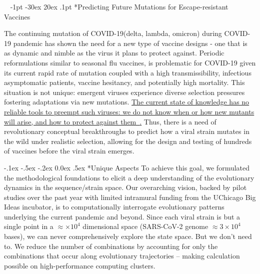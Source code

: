 \documentclass[onecolumn, compsoc,12pt]{IEEEtran}
\makeatletter
\renewcommand\section{\@startsection {section}{1}{\z@}%
                                   {-1pt \@plus -30ex \@minus 20ex}%
                                   {.1pt}%
                                   {\large\bfseries\scshape}}
\renewcommand\paragraph{\@startsection {section}{1}{\z@}%
                                   {-.1ex \@plus -.5ex \@minus -.2ex}%
                                   {0.0ex \@plus.5ex}%
                                   {\fontsize{11}{10}\selectfont\bfseries\itshape\sffamily\color{black}}}
\def\hcov{SARS-CoV-2\xspace}
\def\cov{COVID-19\xspace}
\makeatother
\begin{document}
 

\vspace{20pt}



\clearpage
\setcounter{page}{1}


$\phantom{x}$
\vspace{-35pt}  
\section*{Predicting Future Mutations for  Escape-resistant Vaccines}


The continuing mutation of \cov (delta, lambda, omicron) during \cov pandemic  has shown the need for a new type of vaccine designs - one that is as dynamic and nimble as the virus it plans to protect against. Periodic reformulations similar to  seasonal  flu vaccines,  is  problematic for \cov given its current rapid rate of mutation coupled with a high transmissibility, infectious asymptomatic patients, vaccine hesitancy, and potentially high mortality. This situation is not unique: emergent viruses experience diverse  selection pressures fostering  adaptations via new mutations. \uline{The current state of knowledge has no reliable tools to preempt such viruses: we do not know when or how new mutants will arise, and how to protect against them~\cite{gou2020systematic,hannenhalli1995transforming,jean2007genome,ozery2003two,tesler2002efficient,shao2012approximating,fair2019viral}.} 
Thus, there is a need of revolutionary conceptual  breakthroughs to predict how a viral strain  mutates in the wild under realistic selection, allowing for the design and testing of hundreds of vaccines before the viral strain emerges.

\paragraph*{Unique Aspects} To achieve this goal, we formulated the methodological foundations to elicit a deep understanding of the evolutionary dynamics  in  the sequence/strain space. Our overarching vision, backed by pilot studies over the past year with limited intramural  funding from the UChicago Big Ideas  incubator, is to  computationally interrogate  evolutionary patterns underlying  the current  pandemic and beyond. Since each viral strain is but a single point in a  $\approx  \times10^4$ dimensional space (\hcov genome  $\approx 3 \times 10^4$ bases), we can never comprehensively explore the  state space. But we don't need to. We reduce the number of combinations by accounting for only the combinations that occur along evolutionary trajectories – making calculation possible on high-performance computing clusters.
\end{document}
